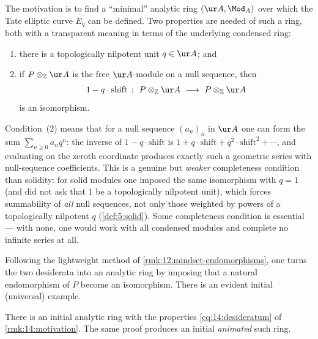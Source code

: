 \begin{remark}
\label{rmk:14:motivation}
The motivation is to find a ``minimal'' analytic ring $(\ur A,\Mod_A)$ over which
the Tate elliptic curve $E_q$ can be defined. Two properties are needed of such a
ring, both with a transparent meaning in terms of the underlying condensed ring:
\begin{enumerate}
\item there is a topologically nilpotent unit $q\in\ur A$; and
\item if $P\otimes_{\mathbb{Z}}\ur A$ is the free $\ur A$-module on a null
sequence, then
\begin{equation}
\label{eq:14:desideratum}
1-q\cdot\mathrm{shift}\ \colon\ P\otimes_{\mathbb{Z}}\ur A\ \longrightarrow\ P\otimes_{\mathbb{Z}}\ur A
\end{equation}
is an isomorphism.
\end{enumerate}
Condition~(2) means that for a null sequence $(a_n)_n$ in $\ur A$ one can form the
sum $\sum_{n\ge 0} a_n q^n$: the inverse of $1-q\cdot\mathrm{shift}$ is
$1+q\cdot\mathrm{shift}+q^2\cdot\mathrm{shift}^2+\cdots$, and evaluating on the
zeroth coordinate produces exactly such a geometric series with null-sequence
coefficients. This is a genuine but \emph{weaker} completeness condition than
solidity: for solid modules one imposed the same isomorphism with $q=1$ (and did
not ask that $1$ be a topologically nilpotent unit), which forces summability of
\emph{all} null sequences, not only those weighted by powers of a topologically
nilpotent $q$ (\cref{def:5:solid}). Some completeness condition is essential ---
with none, one would work with all condensed modules and complete no infinite
series at all.
\end{remark}

Following the lightweight method of \cref{rmk:12:mindset-endomorphisms}, one turns
the two desiderata into an analytic ring by imposing that a natural endomorphism of
$P$ become an isomorphism. There is an evident initial (universal) example.

\begin{proposition}
\label{prop:14:initial}
There is an initial analytic ring with the properties \eqref{eq:14:desideratum} of
\cref{rmk:14:motivation}. The same proof produces an initial \emph{animated} such
ring.
\end{proposition}

